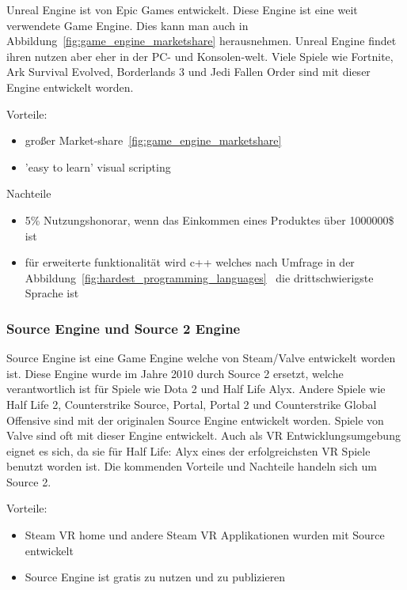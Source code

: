 Unreal Engine ist von Epic Games entwickelt.
Diese Engine ist eine weit verwendete Game Engine.
Dies kann man auch in Abbildung~\ref{fig:game_engine_marketshare} herausnehmen.
Unreal Engine findet ihren nutzen aber eher in der PC- und Konsolen-welt.
Viele Spiele wie Fortnite, Ark Survival Evolved, Borderlands 3 und Jedi Fallen Order sind mit dieser Engine entwickelt worden.

Vorteile:

\begin{itemize}
    \item großer Market-share~\ref{fig:game_engine_marketshare}
    \item 'easy to learn' visual scripting
\end{itemize}

Nachteile

\begin{itemize}
    \item 5\% Nutzungshonorar, wenn das Einkommen eines Produktes über 1000000\$ ist
    \item für erweiterte funktionalität wird c++ welches nach Umfrage in der Abbildung~\ref{fig:hardest_programming_languages}~\cite{JAXCENTER_2018} die drittschwierigste Sprache ist
\end{itemize}

\subsubsection{Source Engine und Source 2 Engine}

Source Engine ist eine Game Engine welche von Steam/Valve entwickelt worden ist.
Diese Engine wurde im Jahre 2010 durch Source 2 ersetzt, welche verantwortlich ist für Spiele wie Dota 2 und Half Life Alyx.
Andere Spiele wie Half Life 2, Counterstrike Source, Portal, Portal 2 und Counterstrike Global Offensive sind mit der originalen Source Engine entwickelt worden.
Spiele von Valve sind oft mit dieser Engine entwickelt.
Auch als VR Entwicklungsumgebung eignet es sich, da sie für Half Life: Alyx eines der erfolgreichsten VR Spiele benutzt worden ist.
Die kommenden Vorteile und Nachteile handeln sich um Source 2.

Vorteile:

\begin{itemize}
    \item Steam VR home und andere Steam VR Applikationen wurden mit Source entwickelt
    \item Source Engine ist gratis zu nutzen und zu publizieren
\end{itemize}


